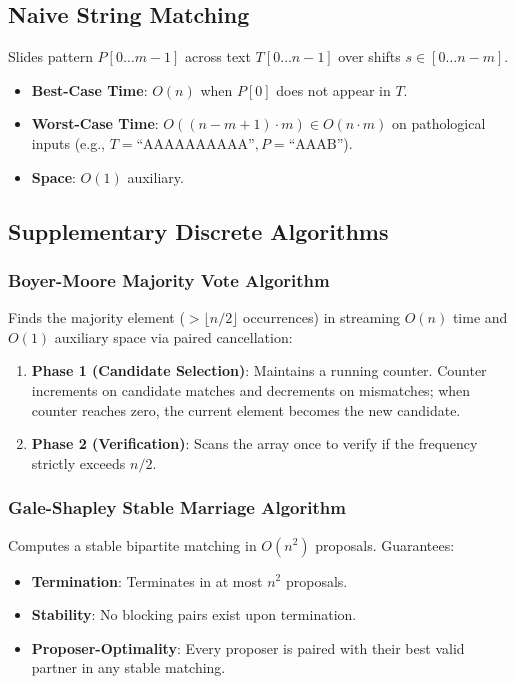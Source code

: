 \documentclass[11pt,a4paper]{article}
\theoremstyle{definition}
\theoremstyle{plain}
\theoremstyle{remark}
\begin{document}
\subsection{Naive String Matching}
Slides pattern $P[0 \dots m-1]$ across text $T[0 \dots n-1]$ over shifts $s \in [0 \dots n-m]$.
\begin{itemize}
    \item \textbf{Best-Case Time}: $O(n)$ when $P[0]$ does not appear in $T$.
    \item \textbf{Worst-Case Time}: $O((n - m + 1) \cdot m) \in O(n \cdot m)$ on pathological inputs (e.g., $T = \text{``AAAAAAAAAA''}, P = \text{``AAAB''}$).
    \item \textbf{Space}: $O(1)$ auxiliary.
\end{itemize}

\subsection{Supplementary Discrete Algorithms}

\subsubsection{Boyer-Moore Majority Vote Algorithm}
Finds the majority element ($> \lfloor n/2 \rfloor$ occurrences) in streaming $O(n)$ time and $O(1)$ auxiliary space via paired cancellation:
\begin{enumerate}
    \item \textbf{Phase 1 (Candidate Selection)}: Maintains a running counter. Counter increments on candidate matches and decrements on mismatches; when counter reaches zero, the current element becomes the new candidate.
    \item \textbf{Phase 2 (Verification)}: Scans the array once to verify if the frequency strictly exceeds $n/2$.
\end{enumerate}

\subsubsection{Gale-Shapley Stable Marriage Algorithm}
Computes a stable bipartite matching in $O(n^2)$ proposals. Guarantees:
\begin{itemize}
    \item \textbf{Termination}: Terminates in at most $n^2$ proposals.
    \item \textbf{Stability}: No blocking pairs exist upon termination.
    \item \textbf{Proposer-Optimality}: Every proposer is paired with their best valid partner in any stable matching.
\end{itemize}
\end{document}

